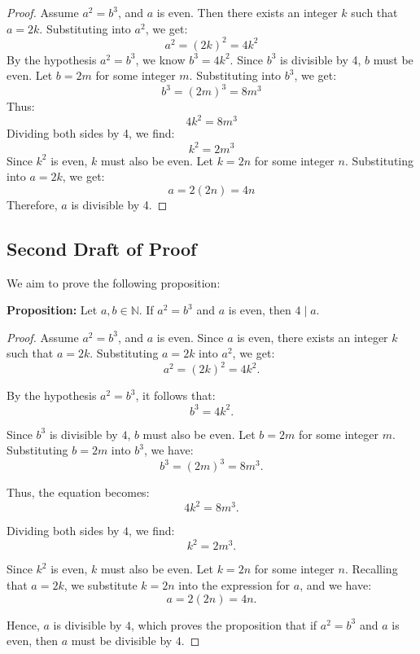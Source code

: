 \documentclass[12pt]{article}
\theoremstyle{definition}
\begin{document}
\begin{proof}
    Assume \( a^2 = b^3 \), and \( a \) is even. Then there exists an integer \( k \) such that \( a = 2k \). Substituting into \( a^2 \), we get:
    \[
    a^2 = (2k)^2 = 4k^2
    \]
    By the hypothesis \( a^2 = b^3 \), we know \( b^3 = 4k^2 \). Since \( b^3 \) is divisible by 4, \( b \) must be even. Let \( b = 2m \) for some integer \( m \). Substituting into \( b^3 \), we get:
    \[
    b^3 = (2m)^3 = 8m^3
    \]
    Thus:
    \[
    4k^2 = 8m^3
    \]
    Dividing both sides by 4, we find:
    \[
    k^2 = 2m^3
    \]
    Since \( k^2 \) is even, \( k \) must also be even. Let \( k = 2n \) for some integer \( n \). Substituting into \( a = 2k \), we get:
    \[
    a = 2(2n) = 4n
    \]
    Therefore, \( a \) is divisible by 4.
\end{proof}

\newpage

\subsection{Second Draft of Proof}

We aim to prove the following proposition:

\textbf{Proposition:} Let \( a, b \in \mathbb{N} \). If \( a^2 = b^3 \) and \( a \) is even, then \( 4 \mid a \).

\begin{proof}
    Assume \( a^2 = b^3 \), and \( a \) is even. Since \( a \) is even, there exists an integer \( k \) such that \( a = 2k \). Substituting \( a = 2k \) into \( a^2 \), we get:
    \[
    a^2 = (2k)^2 = 4k^2.
    \]

    By the hypothesis \( a^2 = b^3 \), it follows that:
    \[
    b^3 = 4k^2.
    \]

    Since \( b^3 \) is divisible by \( 4 \), \( b \) must also be even. Let \( b = 2m \) for some integer \( m \). Substituting \( b = 2m \) into \( b^3 \), we have:
    \[
    b^3 = (2m)^3 = 8m^3.
    \]

    Thus, the equation becomes:
    \[
    4k^2 = 8m^3.
    \]

    Dividing both sides by \( 4 \), we find:
    \[
    k^2 = 2m^3.
    \]

    Since \( k^2 \) is even, \( k \) must also be even. Let \( k = 2n \) for some integer \( n \). Recalling that \( a = 2k \), we substitute \( k = 2n \) into the expression for \( a \), and we have:  
    \[
    a = 2(2n) = 4n.
    \]

    Hence, \( a \) is divisible by \( 4 \), which proves the proposition that if \( a^2 = b^3 \) and \( a \) is even, then \( a \) must be divisible by \( 4 \).
\end{proof}
\newpage
\end{document}
